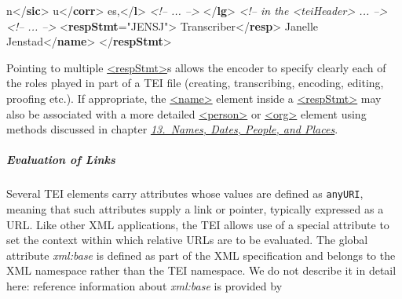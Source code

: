 \begin{shaded}
\hspace*{1em}\hspace*{1em}n{</\textbf{sic}>}\mbox{}\newline 
\hspace*{1em}\hspace*{1em}u{</\textbf{corr}>}\mbox{}\newline 
\hspace*{1em}es,{</\textbf{l}>}\mbox{}\newline 
\textit{<!-- ... -->}\mbox{}\newline 
{</\textbf{lg}>}\mbox{}\newline 
\textit{<!-- in the <teiHeader> ... -->}\mbox{}\newline 
\textit{<!-- ... -->}\mbox{}\newline 
{<\textbf{respStmt}\hspace*{1em}{xml:id}="{JENSJ}">}\mbox{}\newline 
{}Transcriber{</\textbf{resp}>}\mbox{}\newline 
{}Janelle Jenstad{</\textbf{name}>}\mbox{}\newline 
{</\textbf{respStmt}>}\end{shaded}\egroup\par \noindent  Pointing to multiple \hyperref[TEI.respStmt]{<respStmt>}s allows the encoder to specify clearly each of the roles played in part of a TEI file (creating, transcribing, encoding, editing, proofing etc.). If appropriate, the \hyperref[TEI.name]{<name>} element inside a \hyperref[TEI.respStmt]{<respStmt>} may also be associated with a more detailed \hyperref[TEI.person]{<person>} or \hyperref[TEI.org]{<org>} element using methods discussed in chapter \textit{\hyperref[ND]{13.\ Names, Dates, People, and Places}}.
\subparagraph[{Evaluation of Links}]{Evaluation of Links}\label{STGAba}\par
Several TEI elements carry attributes whose values are defined as \texttt{anyURI}, meaning that such attributes supply a link or pointer, typically expressed as a URL. Like other XML applications, the TEI allows use of a special attribute to set the context within which relative URLs are to be evaluated. The global attribute {\itshape xml:base} is defined as part of the XML specification and belongs to the XML namespace rather than the TEI namespace. We do not describe it in detail here: reference information about {\itshape xml:base} is provided by \cite{XMLBASE}\par
